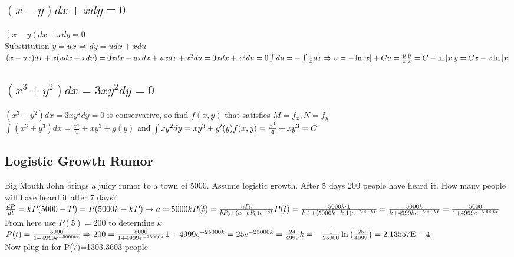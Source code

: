 \documentclass{article}
\begin{document}
\subsection{$(x-y)dx+xdy=0$}
$(x-y)dx+xdy=0$
\\Substitution $y=ux \Rightarrow dy=udx+xdu$
\\$(x-ux)dx+x(udx+xdu)=0 \\ xdx-uxdx+uxdx+x^2du=0 \\ xdx+x^2du=0 \\ \int du= -\int \frac{1}{x}dx \Rightarrow u=-\ln |x|+C \\ u=\frac{y}{x} \\ \frac{y}{x}=C-\ln|x| \\ y=Cx-x\ln |x|$
\subsection{$(x^3+y^2)dx=3xy^2dy=0$}
$(x^3+y^2)dx=3xy^2dy=0$ is conservative, so find $f(x,y)$ that satisfies $M=f_x, N=f_y$
\\$\int (x^3+y^3)dx = \frac{x^4}{4}+xy^3+g(y)$ and $\int xy^2dy = {xy^3} + g'(y) \\ f(x,y)=\frac{x^4}{4}+xy^3=C$
\subsection{Logistic Growth Rumor}
Big Mouth John brings a juicy rumor to a town of 5000. Assume logistic growth. After 5 days 200 people have heard it. How many people will have heard it after 7 days?
$\frac{dP}{dt}=kP(5000-P) = P(5000k-kP) \rightarrow a=5000k \\ P(t)=\frac{aP_0}{bP_0+(a-bP_0)e^{-at}} \\ P(t)=\frac{5000k\cdot 1}{k \cdot 1 + (5000k-k\cdot 1)e^{-5000kt}}=\frac{5000k}{k+4999ke^{-5000kt}} = \frac{5000}{1+4999e^{-5000kt}}$
\\[0.05in]From here use $P(5)=200$ to determine $k$ 
\\[0.05in]$P(t)=\frac{5000}{1+4999e^{-5000kt}} \Rightarrow 200=\frac{5000}{1+4999e^{-25000k}}
\\1+4999e^{-25000k}=25
\\e^{-25000k}=\frac{24}{4999} \\ k=-\frac{1}{25000}\ln\left(\frac{25}{4999}\right) = 2.13557\text{E}-4
$\\Now plug in for P(7)=1303.3603 people
\end{document}
